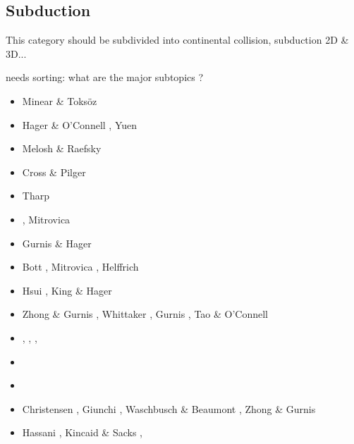 \subsection{Subduction} 
This category should be subdivided into continental collision, subduction 2D \& 3D...

{\color{red} needs sorting: what are the major subtopics ? } 

\begin{scriptsize}
\begin{itemize}
\item[\nineteenseventy] Minear \& Toks{\"o}z \cite{mito70}
\item[\nineteenseventyeight] Hager \& O'Connell \cite{haoc78}, Yuen \etal \cite{yufs78}
\item[\nineteeneighty] Melosh \& Raefsky \cite{mera80}
\item[\nineteeneightytwo] Cross \& Pilger \cite{crpi82}
\item[\nineteeneightyfive] Tharp \cite{thar85}
\item[\nineteeneightysix] \cite{jarr86}, Mitrovica \etal \cite{mipb96}
\item[\nineteeneightyeight] Gurnis \& Hager \cite{guha88}
\item[\nineteeneightynine] Bott \etal \cite{boww89}, Mitrovica \etal \cite{mibj89},
                           Helffrich \etal \cite{hesw89}
\item[\nineteenninety] Hsui \etal \cite{hstt90}, King \& Hager \cite{kiha90}
\item[\nineteenninetytwo] Zhong \& Gurnis \cite{zhgu92}, Whittaker \etal \cite{whbw92}, 
                          Gurnis \cite{gurn92}, Tao \& O'Connell \cite{taoc92}
\item[\nineteenninetythree] \cite{jope93}, \cite{dvnm93}, \cite{wibf93}, \cite{shem93}
\item[\nineteenninetyfour] \cite{zhgu94}\cite{wibe94}
                           \cite{wdbo94a}\cite{wdbo94b}
                           \cite{bequ94}\cite{gaha94}
\item[\nineteenninetyfive] \cite{masa95}
\item[\nineteenninetysix] Christensen \cite{chri96}, Giunchi \etal \cite{gisb96},
                          Waschbusch \& Beaumont \cite{wabe96}, Zhong \& Gurnis \cite{zhgu96}
\item[\nineteenninetyseven] Hassani \etal \cite{hajc97}, Kincaid \& Sacks \cite{kisa97}, 

\end{itemize}
\end{scriptsize}
